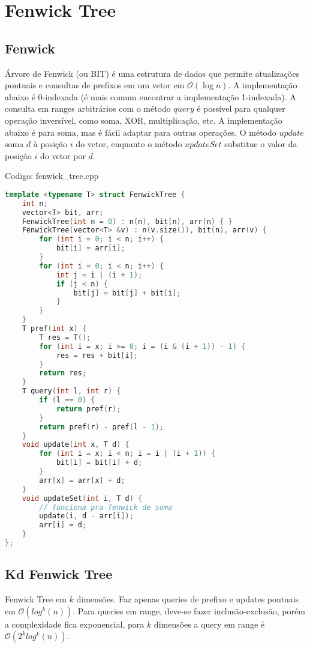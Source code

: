\documentclass[10pt, a4paper, oneside]{book}
\begin{document}
\section{Fenwick Tree}
\subsection{Fenwick}


Árvore de Fenwick (ou BIT) é uma estrutura de dados que permite atualizações pontuais e consultas de prefixos em um vetor em $\mathcal{O}(\log n)$. A implementação abaixo é 0-indexada (é mais comum encontrar a implementação 1-indexada). A consulta em ranges arbitrários com o método $query$ é possível para qualquer operação inversível, como soma, XOR, multiplicação, etc. A implementação abaixo é para soma, mas é fácil adaptar para outras operações. O método $update$ soma $d$ à posição $i$ do vetor, enquanto o método $updateSet$ substitue o valor da posição $i$ do vetor por $d$.

\hfill

Codigo: fenwick\_tree.cpp

\begin{lstlisting}[language=C++]
template <typename T> struct FenwickTree {
    int n;
    vector<T> bit, arr;
    FenwickTree(int n = 0) : n(n), bit(n), arr(n) { }
    FenwickTree(vector<T> &v) : n(v.size()), bit(n), arr(v) {
        for (int i = 0; i < n; i++) {
            bit[i] = arr[i];
        }
        for (int i = 0; i < n; i++) {
            int j = i | (i + 1);
            if (j < n) {
                bit[j] = bit[j] + bit[i];
            }
        }
    }
    T pref(int x) {
        T res = T();
        for (int i = x; i >= 0; i = (i & (i + 1)) - 1) {
            res = res + bit[i];
        }
        return res;
    }
    T query(int l, int r) {
        if (l == 0) {
            return pref(r);
        }
        return pref(r) - pref(l - 1);
    }
    void update(int x, T d) {
        for (int i = x; i < n; i = i | (i + 1)) {
            bit[i] = bit[i] + d;
        }
        arr[x] = arr[x] + d;
    }
    void updateSet(int i, T d) {
        // funciona pra fenwick de soma
        update(i, d - arr[i]);
        arr[i] = d;
    }
};
\end{lstlisting}
\hfill

\subsection{Kd Fenwick Tree}


Fenwick Tree em $k$ dimensões. Faz apenas queries de prefixo e updates pontuais em $\mathcal{O}(log^k(n))$. Para queries em range, deve-se fazer inclusão-exclusão, porém a complexidade fica exponencial, para $k$ dimensões a query em range é $\mathcal{O}(2^k log^k(n))$.
\end{document}
